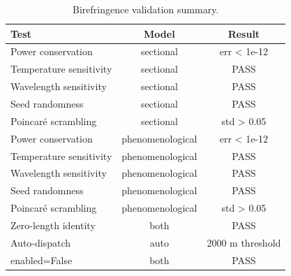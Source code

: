 \begin{table}[!ht]
  \caption{Birefringence validation summary.}
  \label{tab:birefringence}
  \centering
  \begin{tabular}{l c c}
    \toprule
    Test & Model & Result \\
    \midrule
    Power conservation & sectional & err < 1e-12 \\
    Temperature sensitivity & sectional & PASS \\
    Wavelength sensitivity & sectional & PASS \\
    Seed randomness & sectional & PASS \\
    Poincar\'e scrambling & sectional & std > 0.05 \\
    Power conservation & phenomenological & err < 1e-12 \\
    Temperature sensitivity & phenomenological & PASS \\
    Wavelength sensitivity & phenomenological & PASS \\
    Seed randomness & phenomenological & PASS \\
    Poincar\'e scrambling & phenomenological & std > 0.05 \\
    Zero-length identity & both & PASS \\
    Auto-dispatch & auto & 2000 m threshold \\
    enabled=False & both & PASS \\
    \bottomrule
  \end{tabular}
\end{table}
